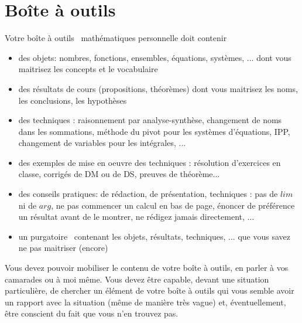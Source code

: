 



\section{Boîte à outils}
Votre \og boîte à outils\fg~ mathématiques personnelle doit contenir\bigskip
\begin{itemize}
 \item des objets: nombres, fonctions, ensembles, équations, systèmes, ... dont vous maitrisez les concepts et le vocabulaire
 \item des résultats de cours (propositions, théorèmes) dont vous maitrisez les noms, les conclusions, les hypothèses
 \item des techniques : raisonnement par analyse-synthèse, changement de noms dans les sommations, méthode du pivot pour les systèmes d'équations, IPP, changement de variables pour les intégrales, ...
 \item des exemples de mise en oeuvre des techniques : résolution d'exercices en classe, corrigés de DM ou de DS, preuves de théorème... 
 \item des conseils pratiques: de rédaction, de présentation, techniques : pas de $lim$ ni de $arg$, ne pas commencer un calcul en bas de page, énoncer de préférence un résultat avant de le montrer, ne rédigez jamais directement, ... 
 \item un \og purgatoire\fg~ contenant les objets, résultats, techniques, ... que vous savez ne pas maitriser (encore)
\end{itemize}
\bigskip
Vous devez pouvoir mobiliser le contenu de votre boîte à outils, en parler à vos camarades ou à moi même.\newline
Vous devez être capable, devant une situation particulière, de chercher un élément de votre boîte à outils qui vous semble avoir un rapport avec la situation (même de manière très vague) et, éventuellement, être conscient du fait que vous n'en trouvez pas.

